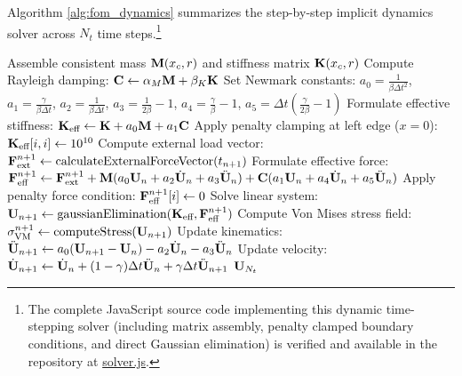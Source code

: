 Algorithm \ref{alg:fom_dynamics} summarizes the step-by-step implicit dynamics solver across $N_t$ time steps.\footnote{The complete JavaScript source code implementing this dynamic time-stepping solver (including matrix assembly, penalty clamped boundary conditions, and direct Gaussian elimination) is verified and available in the repository at \href{https://github.com/WEHBEMUMEN/internship-cnam/blob/main/app/simulations/iga-sim-5.3/src/core/solver.js}{solver.js}.}

\begin{algorithm}[htbp]
    \caption{Full Order Model (FOM) Implicit Dynamics Solver}
    \label{alg:fom_dynamics}
    \begin{algorithmic}[1]
        \State Assemble consistent mass $\mathbf{M}(x_c, r)$ and stiffness matrix $\mathbf{K}(x_c, r)$
        \State Compute Rayleigh damping: $\mathbf{C} \gets \alpha_M \mathbf{M} + \beta_K \mathbf{K}$
        \State Set Newmark constants: $a_0 = \frac{1}{\beta \Delta t^2}$, $a_1 = \frac{\gamma}{\beta \Delta t}$, $a_2 = \frac{1}{\beta \Delta t}$, $a_3 = \frac{1}{2\beta} - 1$, $a_4 = \frac{\gamma}{\beta} - 1$, $a_5 = \Delta t \left( \frac{\gamma}{2\beta} - 1 \right)$
        \State Formulate effective stiffness: $\mathbf{K}_{\text{eff}} \gets \mathbf{K} + a_0 \mathbf{M} + a_1 \mathbf{C}$
        \State Apply penalty clamping at left edge ($x=0$): $\mathbf{K}_{\text{eff}}[i, i] \gets 10^{10}$
            \State Compute external load vector: $\mathbf{F}_{\text{ext}}^{n+1} \gets \text{calculateExternalForceVector}(t_{n+1})$
            \State Formulate effective force: $\mathbf{F}_{\text{eff}}^{n+1} \gets \mathbf{F}_{\text{ext}}^{n+1} + \mathbf{M}(a_0 \mathbf{U}_n + a_2 \dot{\mathbf{U}}_n + a_3 \ddot{\mathbf{U}}_n) + \mathbf{C}(a_1 \mathbf{U}_n + a_4 \dot{\mathbf{U}}_n + a_5 \ddot{\mathbf{U}}_n)$
            \State Apply penalty force condition: $\mathbf{F}_{\text{eff}}^{n+1}[i] \gets 0$
            \State Solve linear system: $\mathbf{U}_{n+1} \gets \text{gaussianElimination}(\mathbf{K}_{\text{eff}}, \mathbf{F}_{\text{eff}}^{n+1})$
            \State Compute Von Mises stress field: $\sigma_{\text{VM}}^{n+1} \gets \text{computeStress}(\mathbf{U}_{n+1})$
            \State Update kinematics: $\ddot{\mathbf{U}}_{n+1} \gets a_0 (\mathbf{U}_{n+1} - \mathbf{U}_n) - a_2 \dot{\mathbf{U}}_n - a_3 \ddot{\mathbf{U}}_n$
            \State Update velocity: $\dot{\mathbf{U}}_{n+1} \gets \dot{\mathbf{U}}_n + (1 - \gamma)\Delta t \ddot{\mathbf{U}}_n + \gamma \Delta t \ddot{\mathbf{U}}_{n+1}$
        \EndFor
        \State \Return $\mathbf{U}_{N_t}$
        \EndProcedure
    \end{algorithmic}
\end{algorithm}
\newpage



